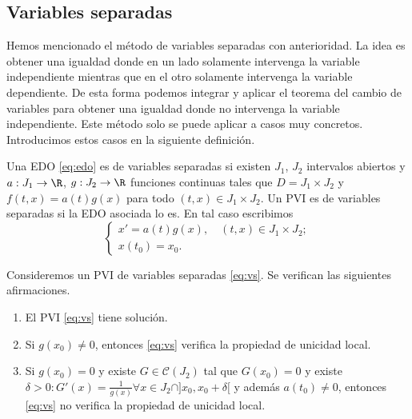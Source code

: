 \documentclass{article}
\begin{document}
\subsection{Variables separadas}

Hemos mencionado el método de variables separadas con anterioridad. La idea es obtener una igualdad
donde en un lado solamente intervenga la variable independiente mientras que en el otro solamente
intervenga la variable dependiente. De esta forma podemos integrar y aplicar el teorema del cambio
de variables para obtener una igualdad donde no intervenga la variable independiente. Este método
solo se puede aplicar a casos muy concretos. Introducimos estos casos en la siguiente definición.

\begin{definition}
  Una EDO \eqref{eq:edo} es de variables separadas si existen $J_1$, $J_2$ intervalos abiertos y
  $a: J_1 \to \R$, $g: J_2 \to \R$ funciones continuas tales que $D = J_1 \times J_2$ y
  $f(t,x) = a(t) g(x)$ para todo $(t,x) \in J_1 \times J_2$.  Un PVI es de variables separadas si la
  EDO asociada lo es. En tal caso escribimos
  \begin{equation}
    \label{eq:vs}
    \begin{cases}
      x' = a(t)g(x), \quad (t,x) \in J_1 \times J_2; \\
      x(t_0) = x_0.
    \end{cases}
    \tag{VS}
  \end{equation}
\end{definition}

\begin{thm}
  Consideremos un PVI de variables separadas \eqref{eq:vs}. Se verifican las siguientes
  afirmaciones.
  \begin{enumerate}
  \item El PVI \eqref{eq:vs} tiene solución.
  \item Si $g(x_0) \neq 0$, entonces \eqref{eq:vs} verifica la propiedad de unicidad local.
  \item Si $g(x_0) = 0$ y existe $ G \in \mathcal{C} (J_2)$ tal que $G(x_0) = 0$ y existe
    $\delta > 0: G'(x) = \frac{1}{g(x)} \forall x \in J_2 \cap ]x_0, x_0 + \delta[$ y además
    $a(t_0) \neq 0$, entonces \eqref{eq:vs} no verifica la propiedad de unicidad local.
  \end{enumerate}
\end{thm}
\end{document}
